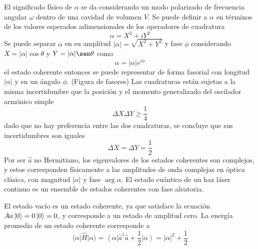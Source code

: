 El significado físico de $\alpha$ se da considerando un modo polarizado de frecuencia angular $\omega$ dentro de una cavidad de volumen $V$. Se puede definir a $\alpha$ en términos de los valores esperados adimensionales de los operadores de cuadratura
\begin{equation*}
  \alpha = X^2 + iY^2
\end{equation*}
Se puede separar $\alpha$ en su amplitud $|\alpha|=\sqrt{X^2 + Y^2}$ y fase $\phi$ considerando $X = |\alpha|\cos\theta$ y $Y=|\alpha|\sen\theta$ como
\begin{equation*}
  \alpha = |\alpha|e^{i\phi}
\end{equation*}
el estado coherente entonces se puede representar de forma fasorial con longitud $|\alpha|$ y en un ángulo $\phi$.
(Figura de fasores)
Las cuadraturas están sujetas a la misma incertidumbre que la posición y el momento generalizado del oscilador armónico simple
\begin{equation*}
  \Delta X \Delta Y \geq \frac{1}{4}
\end{equation*}
dado que no hay preferencia entre las dos cuadraturas, se concluye que sus incertidumbres son iguales
\begin{equation*}
  \Delta X = \Delta Y = \frac{1}{2}
\end{equation*}
Por ser $\hat{a}$ no Hermitiano, los eigenvalores de los estados coherentes son complejos, y estos corresponden físicamente a las amplitudes de onda complejas en óptica clásica, con magnitud $|\alpha|$ y fase $\arg \alpha$. El estado cuántico de un haz láser continuo es un ensemble de estados coherentes con fase aleatoria.

El estado vacío es un estado coherente, ya que satisface la ecuación $A{a} \ket{0} = 0 \ket{0} = 0$, y corresponde a un estado de amplitud cero. La energía promedio de un estado coherente corresponde a
\begin{equation*}
  \langle \alpha \vert \hat{H}\vert \alpha \rangle = \left\langle \alpha \right\vert \hat{a}^{\dagger}\hat{a} + \frac{1}{2} \left\vert \alpha \right\rangle = |\alpha|^2 + \frac{1}{2}
\end{equation*}

